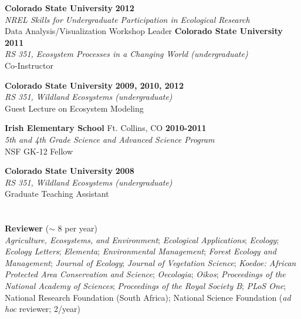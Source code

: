 \documentclass[margin,line]{resume}
\begin{document}
\begin{resume}
    \textbf{Colorado State University} \hfill \textbf{2012}\\ 
               \textsl{NREL Skills for Undergraduate Participation in Ecological Research}\\
               Data Analysis/Visualization Workshop Leader
               		      \newpage{}
    \textbf{Colorado State University} \hfill \textbf{2011}\\ 
               \textsl{RS 351, Ecosystem Processes in a Changing World (undergraduate)}\\
               Co-Instructor 

    \textbf{Colorado State University} \hfill \textbf{2009, 2010, 2012}\\ 
               \textsl{RS 351, Wildland Ecosystems (undergraduate)}\\
               Guest Lecture on Ecosystem Modeling
               
    \textbf{Irish Elementary School} Ft. Collins, CO \hfill \textbf{2010-2011}\\ 
   		\textsl{5th and 4th Grade Science and Advanced Science Program}\\
		NSF GK-12 Fellow
		
     \textbf{Colorado State University} \hfill \textbf{2008}\\ 
               \textsl{RS 351, Wildland Ecosystems (undergraduate)}\\
               Graduate Teaching Assistant 
     \section{\textmd{\textsf{\color{MidnightBlue}{Professional\\Service}}}}
    \textbf{Reviewer} ($\sim$ 8 per year)\\
    \textsl{Agriculture, Ecosystems, and Environment};
    \textsl{Ecological Applications};
    \textsl{Ecology};
    \textsl{Ecology Letters};
    \textsl{Elementa};
    \textsl{Environmental Management};
    \textsl{Forest Ecology and Management};
    \textsl{Journal of Ecology};
    \textsl{Journal of Vegetation Science};
    \textsl{Koedoe: African Protected Area Conservation and Science};
    \textsl{Oecologia};
    \textsl{Oikos};
    \textsl{Proceedings of the National Academy of Sciences};
    \textsl{Proceedings of the Royal Society B};
     \textsl{PLoS One};
     National Research Foundation (South Africa);
     National Science Foundation (\emph{ad hoc} reviewer; 2/year)
	


\end{resume}
\end{document}
